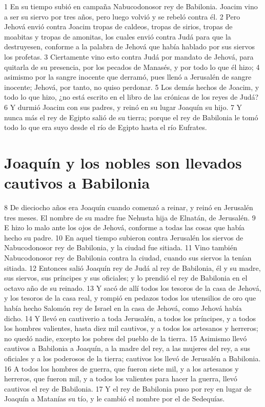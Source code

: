 1 En su tiempo subió en campaña Nabucodonosor rey de Babilonia. Joacim vino a ser su siervo por tres años, pero luego volvió y se rebeló contra él.
2 Pero Jehová envió contra Joacim tropas de caldeos, tropas de sirios, tropas de moabitas y tropas de amonitas, los cuales envió contra Judá para que la destruyesen, conforme a la palabra de Jehová que había hablado por sus siervos los profetas.
3 Ciertamente vino esto contra Judá por mandato de Jehová, para quitarla de su presencia, por los pecados de Manasés, y por todo lo que él hizo;
4 asimismo por la sangre inocente que derramó, pues llenó a Jerusalén de sangre inocente; Jehová, por tanto, no quiso perdonar.
5 Los demás hechos de Joacim, y todo lo que hizo, ¿no está escrito en el libro de las crónicas de los reyes de Judá?
6 Y durmió Joacim con sus padres, y reinó en su lugar Joaquín su hijo.
7 Y nunca más el rey de Egipto salió de su tierra; porque el rey de Babilonia le tomó todo lo que era suyo desde el río de Egipto hasta el río Eufrates.
\section*{Joaquín y los nobles son llevados cautivos a Babilonia}

 
8 De dieciocho años era Joaquín cuando comenzó a reinar, y reinó en Jerusalén tres meses. El nombre de su madre fue Nehusta hija de Elnatán, de Jerusalén.
9 E hizo lo malo ante los ojos de Jehová, conforme a todas las cosas que había hecho su padre.
10 En aquel tiempo subieron contra Jerusalén los siervos de Nabucodonosor rey de Babilonia, y la ciudad fue sitiada.
11 Vino también Nabucodonosor rey de Babilonia contra la ciudad, cuando sus siervos la tenían sitiada.
12 Entonces salió Joaquín rey de Judá al rey de Babilonia, él y su madre, sus siervos, sus príncipes y sus oficiales; y lo prendió el rey de Babilonia en el octavo año de su reinado. 
13 Y sacó de allí todos los tesoros de la casa de Jehová, y los tesoros de la casa real, y rompió en pedazos todos los utensilios de oro que había hecho Salomón rey de Israel en la casa de Jehová, como Jehová había dicho.
14 Y llevó en cautiverio a toda Jerusalén, a todos los príncipes, y a todos los hombres valientes, hasta diez mil cautivos, y a todos los artesanos y herreros; no quedó nadie, excepto los pobres del pueblo de la tierra.
15 Asimismo llevó cautivos a Babilonia a Joaquín, a la madre del rey, a las mujeres del rey, a sus oficiales y a los poderosos de la tierra; cautivos los llevó de Jerusalén a Babilonia. 
16 A todos los hombres de guerra, que fueron siete mil, y a los artesanos y herreros, que fueron mil, y a todos los valientes para hacer la guerra, llevó cautivos el rey de Babilonia.
17 Y el rey de Babilonia puso por rey en lugar de Joaquín a Matanías su tío, y le cambió el nombre por el de Sedequías. 
